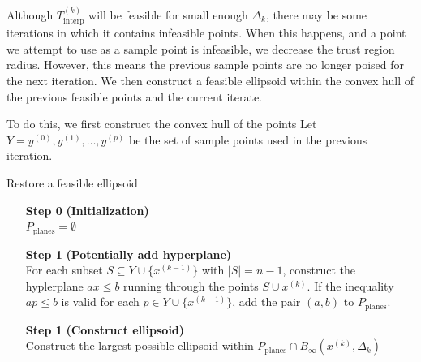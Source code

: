 \documentclass{article}
\newenvironment{comment}
  {\par\medskip
   \color{red}%
   \begin{framed}
   \textbf{Comment: }\ignorespaces}
 {\end{framed}
  \medskip}
\theoremstyle{case}
\numberwithin{theorem}{subsection}
\newcommand{\dk}{\Delta_k}
\newcommand{\sampletrk}{{T_{\text{interp}}^{(k)}}}
\newcommand{\tr}{{ B_{\infty}\left(\xk, \dk\right) }}
\newcommand{\xk}{{x^{(k)}}}
\begin{document}
Although $\sampletrk$ will be feasible for small enough $\dk$, there may be some iterations in which it contains infeasible points.
When this happens, and a point we attempt to use as a sample point is infeasible, we decrease the trust region radius.
However, this means the previous sample points are no longer poised for the next iteration.
We then construct a feasible ellipsoid within the convex hull of the previous feasible points and the current iterate.

%             
% 


To do this, we first construct the convex hull of the points 
Let $Y = y^{(0)}, y^{(1)}, \ldots, y^{(p)}$ be the set of sample points used in the previous iteration.

\begin{algorithm}[H]
    \caption{Restore a feasible ellipsoid}
    \label{restore_feasible_ellipsoid}
    \begin{itemize}
        \item[\textbf{Step 0}] \textbf{(Initialization)} \\
            $P_{\textrm{planes}} = \emptyset$
            
        \item[\textbf{Step 1}] \textbf{(Potentially add hyperplane)} \\
	    For each subset $S \subseteq Y \cup \{x^{(k-1)}\}$ with $|S| = n - 1$, construct the hyplerplane $ax\le b$ running through the points $S \cup \xk$.
	    If the inequality $ap \le b$ is valid for each $p \in Y \cup \{x^{(k-1)}\}$, add the pair $(a, b)$ to $P_{\textrm{planes}}$.
	
	\item[\textbf{Step 1}] \textbf{(Construct ellipsoid)} \\
	   Construct the largest possible ellipsoid within $P_{\textrm{planes}} \cap \tr$
    \end{itemize}
\end{algorithm}
\end{document}
